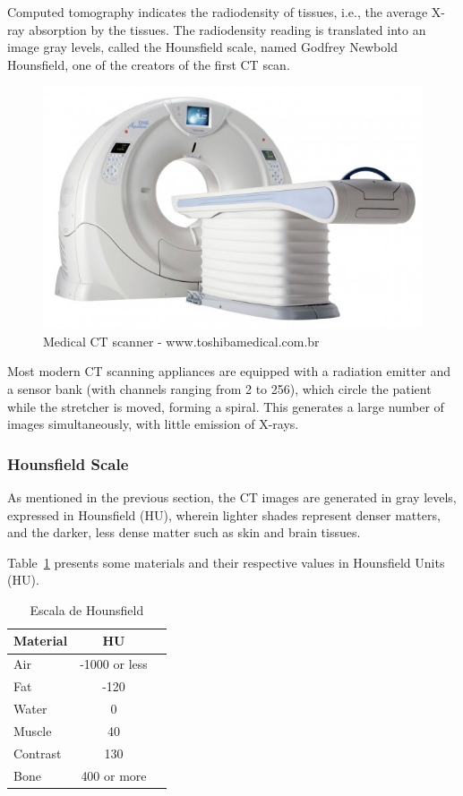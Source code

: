 Computed tomography indicates the radiodensity of tissues, i.e., the average X-ray absorption by the tissues. The radiodensity reading is translated into an image gray levels, called the Hounsfield scale, named Godfrey Newbold Hounsfield, one of the creators of the first CT scan.

\begin{figure}[!htb]
\centering
\includegraphics[scale=0.4]{../user_guide_figures/tomografo.jpg}
\caption{Medical CT scanner - www.toshibamedical.com.br}
\end{figure}

Most modern CT scanning appliances are equipped with a radiation emitter and a sensor bank (with channels ranging from 2 to 256), which circle the patient while the stretcher is moved, forming a spiral. This generates a large number of images simultaneously, with little emission of X-rays.

\subsubsection{Hounsfield Scale}

As mentioned in the previous section, the CT images are generated in gray levels, expressed in Hounsfield (HU), wherein lighter shades represent denser matters, and the darker, less dense matter such as skin and brain tissues. 

Table~\ref{tab:escala_hounsfield} presents some materials and their respective values in Hounsfield Units (HU).

\begin{table}[h]
\centering
\caption{Escala de Hounsfield}
\begin{tabular}{lcc}\\
\hline %
Material & HU\\
\hline
\hline
Air & -1000 or less\\
Fat & -120\\
Water & 0\\
Muscle & 40\\
Contrast & 130\\
Bone & 400 or more\\
\hline
\end{tabular}
\label{tab:escala_hounsfield}
\end{table}


